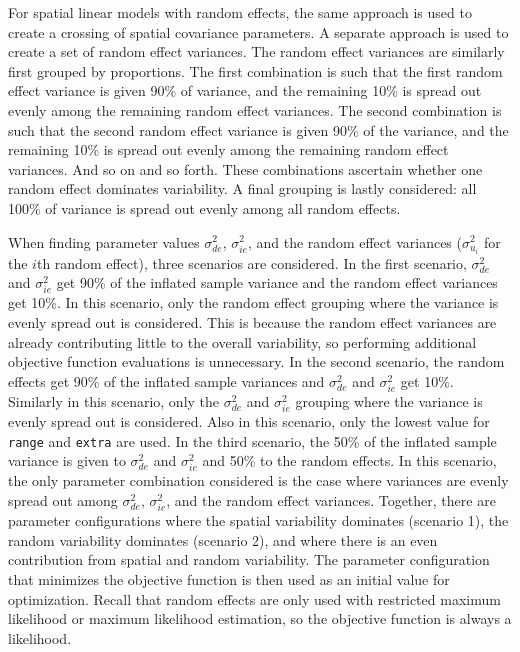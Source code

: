 \documentclass{article}
\begin{document}
For spatial linear models with random effects, the same approach is used
to create a crossing of spatial covariance parameters. A separate
approach is used to create a set of random effect variances. The random
effect variances are similarly first grouped by proportions. The first
combination is such that the first random effect variance is given 90\%
of variance, and the remaining 10\% is spread out evenly among the
remaining random effect variances. The second combination is such that
the second random effect variance is given 90\% of the variance, and the
remaining 10\% is spread out evenly among the remaining random effect
variances. And so on and so forth. These combinations ascertain whether
one random effect dominates variability. A final grouping is lastly
considered: all 100\% of variance is spread out evenly among all random
effects.

When finding parameter values \(\sigma^2_{de}\), \(\sigma^2_{ie}\), and
the random effect variances (\(\sigma^2_{u_i}\) for the \(i\)th random
effect), three scenarios are considered. In the first scenario,
\(\sigma^2_{de}\) and \(\sigma^2_{ie}\) get 90\% of the inflated sample
variance and the random effect variances get 10\%. In this scenario,
only the random effect grouping where the variance is evenly spread out
is considered. This is because the random effect variances are already
contributing little to the overall variability, so performing additional
objective function evaluations is unnecessary. In the second scenario,
the random effects get 90\% of the inflated sample variances and
\(\sigma^2_{de}\) and \(\sigma^2_{ie}\) get 10\%. Similarly in this
scenario, only the \(\sigma^2_{de}\) and \(\sigma^2_{ie}\) grouping
where the variance is evenly spread out is considered. Also in this
scenario, only the lowest value for \texttt{range} and \texttt{extra}
are used. In the third scenario, the 50\% of the inflated sample
variance is given to \(\sigma^2_{de}\) and \(\sigma^2_{ie}\) and 50\% to
the random effects. In this scenario, the only parameter combination
considered is the case where variances are evenly spread out among
\(\sigma^2_{de}\), \(\sigma^2_{ie}\), and the random effect variances.
Together, there are parameter configurations where the spatial
variability dominates (scenario 1), the random variability dominates
(scenario 2), and where there is an even contribution from spatial and
random variability. The parameter configuration that minimizes the
objective function is then used as an initial value for optimization.
Recall that random effects are only used with restricted maximum
likelihood or maximum likelihood estimation, so the objective function
is always a likelihood.
\end{document}

